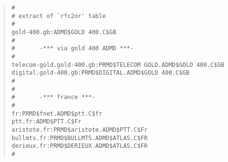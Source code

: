 \begin{quote}\small\begin{verbatim}
#
# extract of `rfc2or' table
#
gold-400.gb:ADMD$GOLD 400.C$GB
#
#       -*** via gold 400 ADMD ***-
#
telecom-gold.gold-400.gb:PRMD$TELECOM GOLD.ADMD$GOLD 400.C$GB
digital.gold-400.gb:PRMD$DIGITAL.ADMD$GOLD 400.C$GB
#
#
#       -*** france ***-
#
fr:PRMD$fnet.ADMD$ptt.C$fr
ptt.fr:ADMD$PTT.C$Fr
aristote.fr:PRMD$aristote.ADMD$PTT.C$Fr
bullmts.fr:PRMD$BULLMTS.ADMD$ATLAS.C$FR
derieux.fr:PRMD$DERIEUX.ADMD$ATLAS.C$FR
#
\end{verbatim}\end{quote}
